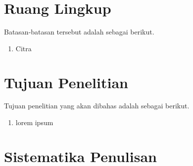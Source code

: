 \section{Ruang Lingkup}

Batasan-batasan tersebut adalah sebagai berikut.
\begin{enumerate}
  \item Citra
\end{enumerate}

\section{Tujuan Penelitian}

Tujuan penelitian yang akan dibahas adalah sebagai berikut.
\begin{enumerate}
  \item lorem ipsum
\end{enumerate}

\section{Sistematika Penulisan}

